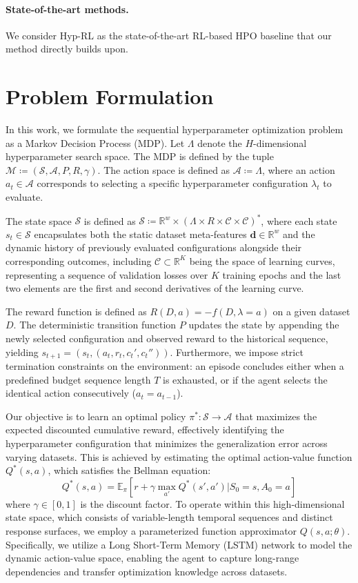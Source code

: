 \documentclass[12pt]{article}
\begin{document}
\paragraph{State-of-the-art methods.}
We consider Hyp-RL as the state-of-the-art RL-based HPO baseline that our method directly builds upon.

\section{Problem Formulation}

In this work, we formulate the sequential hyperparameter optimization problem as a Markov Decision Process (MDP). Let $\Lambda$ denote the $H$-dimensional hyperparameter search space. The MDP is defined by the tuple $\mathcal{M}\coloneqq (\mathcal{S}, \mathcal{A}, P, R, \gamma)$. The action space is defined as $\mathcal{A}\coloneqq\Lambda$, where an action $a_t\in\mathcal{A}$ corresponds to selecting a specific hyperparameter configuration $\lambda_t$ to evaluate.


The state space $\mathcal{S}$ is defined as $\mathcal{S}\coloneqq\mathbb{R}^w\times(\Lambda\times R\times \mathcal{C}\times \mathcal{C})^*$, where each state $s_t\in\mathcal{S}$ encapsulates both the static dataset meta-features $\mathbf{d}\in\mathbb{R}^w$ and the dynamic history of previously evaluated configurations alongside their corresponding outcomes, including $\mathcal{C}\subset\mathbb{R}^K$ being the space of learning curves, representing a sequence of validation losses over $K$ training epochs and the last two elements are the first and second derivatives of the learning curve. 

The reward function is defined as $R(D, a)=-f(D, \lambda=a)$ on a given dataset $D$. The deterministic transition function $P$ updates the state by appending the newly selected configuration and observed reward to the historical sequence, yielding $s_{t+1}=(s_t,(a_t, r_t, c_t', c_t''))$. Furthermore, we impose strict termination constraints on the environment: an episode concludes either when a predefined budget sequence length $T$ is exhausted, or if the agent selects the identical action consecutively ($a_t=a_{t-1}$).

Our objective is to learn an optimal policy $\pi^*:\mathcal{S}\rightarrow\mathcal{A}$ that maximizes the expected discounted cumulative reward, effectively identifying the hyperparameter configuration that minimizes the generalization error across varying datasets. This is achieved by estimating the optimal action-value function $Q^*(s,a)$, which satisfies the Bellman equation:
$$Q^*(s, a)=\mathbb{E}_{\pi}[r+\gamma\max_{a'}Q^*(s',a')|S_0=s,A_0=a]$$
where $\gamma\in[0, 1]$ is the discount factor. To operate within this high-dimensional state space, which consists of variable-length temporal sequences and distinct response surfaces, we employ a parameterized function approximator $Q(s,a;\theta)$. Specifically, we utilize a Long Short-Term Memory (LSTM) network to model the dynamic action-value space, enabling the agent to capture long-range dependencies and transfer optimization knowledge across datasets.
\end{document}
